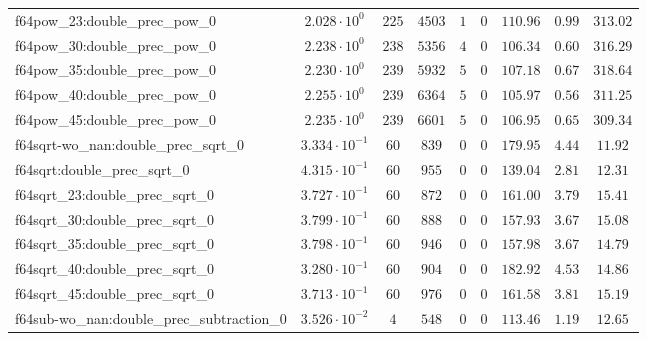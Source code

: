 \begin{tabular}{|l|c|c|c|c|c|c|c|c|}
f64pow\_23:double\_prec\_pow\_0                & $ 2.028 \cdot 10^{0}  $ & $ 225    $ & $ 4503  $ & $ 1   $ & $ 0      $ & $ 110.96      $ & $ 0.99    $ & $ 313.02  $ \\
f64pow\_30:double\_prec\_pow\_0                & $ 2.238 \cdot 10^{0}  $ & $ 238    $ & $ 5356  $ & $ 4   $ & $ 0      $ & $ 106.34      $ & $ 0.60    $ & $ 316.29  $ \\
f64pow\_35:double\_prec\_pow\_0                & $ 2.230 \cdot 10^{0}  $ & $ 239    $ & $ 5932  $ & $ 5   $ & $ 0      $ & $ 107.18      $ & $ 0.67    $ & $ 318.64  $ \\
f64pow\_40:double\_prec\_pow\_0                & $ 2.255 \cdot 10^{0}  $ & $ 239    $ & $ 6364  $ & $ 5   $ & $ 0      $ & $ 105.97      $ & $ 0.56    $ & $ 311.25  $ \\
f64pow\_45:double\_prec\_pow\_0                & $ 2.235 \cdot 10^{0}  $ & $ 239    $ & $ 6601  $ & $ 5   $ & $ 0      $ & $ 106.95      $ & $ 0.65    $ & $ 309.34  $ \\
f64sqrt-wo\_nan:double\_prec\_sqrt\_0          & $ 3.334 \cdot 10^{-1} $ & $ 60     $ & $ 839   $ & $ 0   $ & $ 0      $ & $ 179.95      $ & $ 4.44    $ & $ 11.92   $ \\
f64sqrt:double\_prec\_sqrt\_0                  & $ 4.315 \cdot 10^{-1} $ & $ 60     $ & $ 955   $ & $ 0   $ & $ 0      $ & $ 139.04      $ & $ 2.81    $ & $ 12.31   $ \\
f64sqrt\_23:double\_prec\_sqrt\_0              & $ 3.727 \cdot 10^{-1} $ & $ 60     $ & $ 872   $ & $ 0   $ & $ 0      $ & $ 161.00      $ & $ 3.79    $ & $ 15.41   $ \\
f64sqrt\_30:double\_prec\_sqrt\_0              & $ 3.799 \cdot 10^{-1} $ & $ 60     $ & $ 888   $ & $ 0   $ & $ 0      $ & $ 157.93      $ & $ 3.67    $ & $ 15.08   $ \\
f64sqrt\_35:double\_prec\_sqrt\_0              & $ 3.798 \cdot 10^{-1} $ & $ 60     $ & $ 946   $ & $ 0   $ & $ 0      $ & $ 157.98      $ & $ 3.67    $ & $ 14.79   $ \\
f64sqrt\_40:double\_prec\_sqrt\_0              & $ 3.280 \cdot 10^{-1} $ & $ 60     $ & $ 904   $ & $ 0   $ & $ 0      $ & $ 182.92      $ & $ 4.53    $ & $ 14.86   $ \\
f64sqrt\_45:double\_prec\_sqrt\_0              & $ 3.713 \cdot 10^{-1} $ & $ 60     $ & $ 976   $ & $ 0   $ & $ 0      $ & $ 161.58      $ & $ 3.81    $ & $ 15.19   $ \\
f64sub-wo\_nan:double\_prec\_subtraction\_0    & $ 3.526 \cdot 10^{-2} $ & $ 4      $ & $ 548   $ & $ 0   $ & $ 0      $ & $ 113.46      $ & $ 1.19    $ & $ 12.65   $ \\

\end{tabular}
